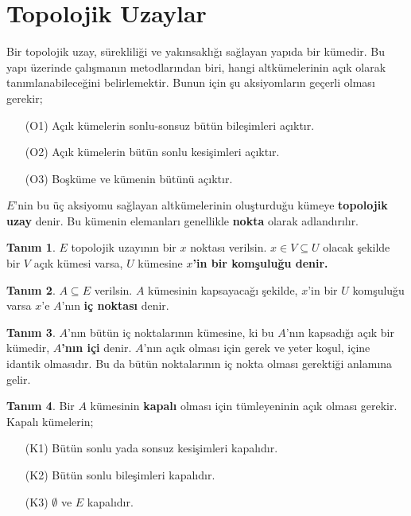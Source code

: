 \documentclass[11pt]{article}
\theoremstyle{plain}
\theoremstyle{definition}
\newtheorem{definition}{Tanım}
\theoremstyle{remark}
\numberwithin{equation}{section}
\renewcommand{\%}{{\small \%}}
\begin{document}
\section{Topolojik Uzaylar}\label{T:intro}
Bir topolojik uzay, sürekliliği ve yakınsaklığı sağlayan yapıda bir kümedir. Bu yapı üzerinde çalışmanın metodlarından biri, hangi altkümelerinin açık olarak tanımlanabileceğini belirlemektir. Bunun için şu aksiyomların geçerli olması gerekir;

\begin{itemize}
\item[(O1)] Açık kümelerin sonlu-sonsuz bütün bileşimleri açıktır.
\item[(O2)] Açık kümelerin bütün sonlu kesişimleri açıktır.
\item[(O3)] Boşküme ve kümenin bütünü açıktır.
\end{itemize}
$E$'nin bu üç aksiyomu sağlayan altkümelerinin oluşturduğu kümeye \textbf{topolojik uzay} denir. Bu kümenin elemanları genellikle \textbf{nokta} olarak adlandırılır.\newpage
\begin{definition}
$E$ topolojik uzayının bir $x$ noktası verilsin. $x\in V\subseteq U$ olacak şekilde bir $V$ açık kümesi varsa, $U$ kümesine \textbf{$x$'in bir komşuluğu denir.}
\end{definition}

\begin{definition}
$A\subseteq E$ verilsin. $A$ kümesinin kapsayacağı şekilde, $x$'in bir $U$ komşuluğu varsa $x$'e $A$'nın \textbf{iç noktası} denir.
\end{definition}

\begin{definition}
$A$'nın bütün iç noktalarının kümesine, ki bu $A$'nın kapsadığı açık bir kümedir, \textbf{$A$'nın içi} denir. $A$'nın açık olması için gerek ve yeter koşul, içine idantik olmasıdır. Bu da bütün noktalarının iç nokta olması gerektiği anlamına gelir.
\end{definition}

\begin{definition}
Bir $A$ kümesinin \textbf{kapalı} olması için tümleyeninin açık olması gerekir. Kapalı kümelerin;
\begin{itemize}
\item[(K1)] Bütün sonlu yada sonsuz kesişimleri kapalıdır.
\item[(K2)] Bütün sonlu bileşimleri kapalıdır.
\item[(K3)] $\emptyset$ ve $E$ kapalıdır.
\end{itemize}
\end{definition}
\end{document}
